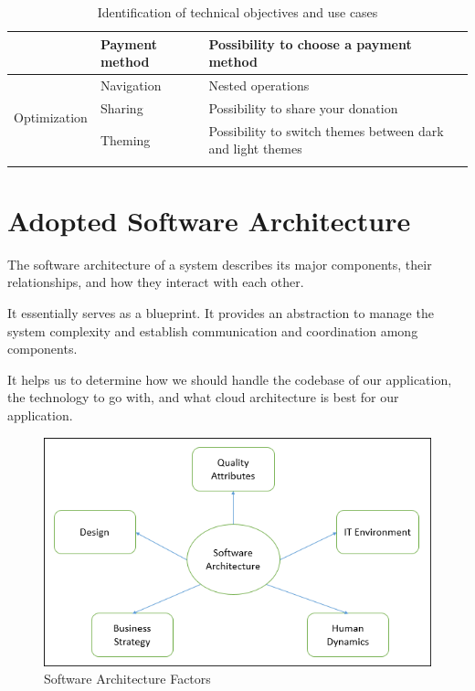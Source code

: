 \begin{longtable}{|m{10em}|m{10em}|m{10em}|}
                                           & \multirow{1}{*}{Payment method}          & Possibility to choose a payment method                     \\\hline
      \multirow{3}{*}{Optimization}        & \multirow{1}{*}{Navigation}              & Nested operations                                          \\\cline{2-3}
                                           & \multirow{1}{*}{Sharing}                 & Possibility to share your donation                         \\\cline{2-3}
                                           & \multirow{1}{*}{Theming}                 & Possibility to switch themes between dark and light themes \\\hline

      \caption{Identification of technical objectives and use cases}
      \label{tab:id_tech_objec_uc}
\end{longtable}





\section{Adopted Software Architecture}
The software architecture of a system describes its major components, their relationships, and how they interact with each other.

It essentially serves as a blueprint. It provides an abstraction to manage the system complexity and establish communication and coordination among components.

It helps us to determine how we should handle the codebase of our application, the technology to go with, and what cloud architecture is best for our application.

\begin{figure}[!ht]
      \center
      \includegraphics[scale=0.70]{assets/software_arch.jpg}
      \caption{Software Architecture Factors}
      \label{fig:mvc}
\end{figure}

